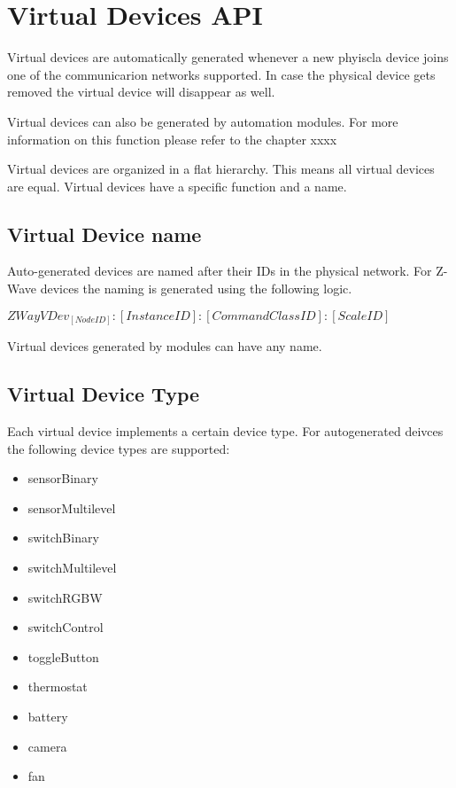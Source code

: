  \section{Virtual Devices API}

Virtual devices are automatically generated whenever a new phyiscla device joins one of 
the communicarion networks supported. In case the physical device gets removed the virtual 
device will disappear as well.

Virtual devices can also be generated by automation modules. For more information on this 
function please refer to the chapter xxxx

Virtual devices are organized in a flat hierarchy. This means all virtual devices are 
equal.  Virtual devices have a specific function and a name.

\subsection{Virtual Device name}

Auto-generated devices are named after their IDs in the physical network. For Z-Wave 
devices the naming is generated using the following logic.

$ZWayVDev_[Node ID]:[Instance ID]:[Command Class ID]:[Scale ID]$

Virtual devices generated by modules can have any name.

\subsection{Virtual Device Type}

Each virtual device implements a certain device type.  For autogenerated deivces the 
following device types are supported:


\begin{itemize}
\item sensorBinary
\item sensorMultilevel
\item switchBinary
\item switchMultilevel
\item switchRGBW
\item switchControl
\item toggleButton
\item thermostat
\item battery
\item camera
\item fan
\end{itemize}


